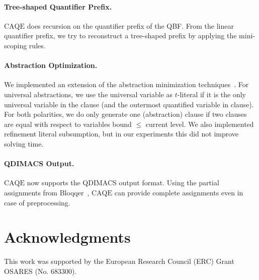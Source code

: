 \documentclass[11pt,twocolumn]{article}
\newcommand{\caqe}{\text{CAQE}}
\begin{document}
\paragraph{Tree-shaped Quantifier Prefix.}
$\caqe$ does recursion on the quantifier prefix of the QBF.
From the linear quantifier prefix, we try to reconstruct a tree-shaped prefix by applying the mini-scoping rules. 

\paragraph{Abstraction Optimization.}

We implemented an extension of the abstraction minimization techniques~\cite{conf/sat/BalabanovJSMB16}.
For universal abstractions, we use the universal variable as $t$-literal if it is the only universal variable in the clause (and the outermost quantified variable in clause).
For both polarities, we do only generate one (abstraction) clause if two clauses are equal with respect to variables bound $\leq$ current level.
We also implemented refinement literal subsumption, but in our experiments this did not improve solving time.

\paragraph{QDIMACS Output.}

$\caqe$ now supports the QDIMACS output format.
Using the partial assignments from Bloqqer~\cite{conf/date/SeidlK14}, $\caqe$ can provide complete assignments even in case of preprocessing.


\section{Acknowledgments}

This work was supported by the European Research Council (ERC) Grant OSARES (No. 683300).




\end{document}

